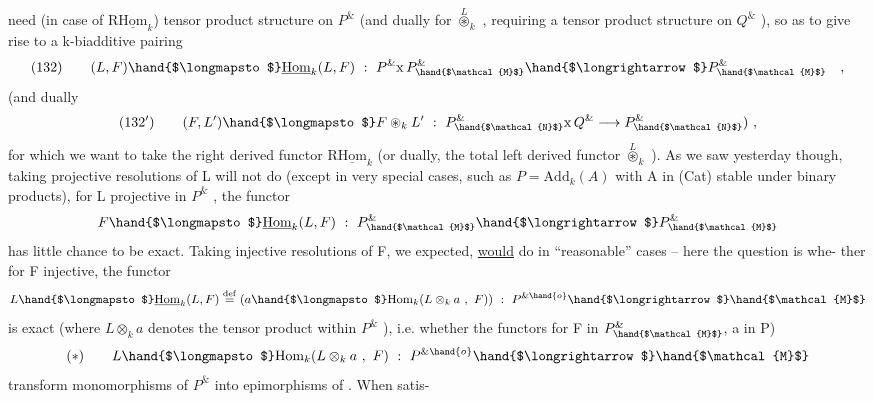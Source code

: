 
need (in case of R$\underline{\mathrm{Hom}}_k$)   tensor product structure on $P^{\&}$ (and dually
for $\overset{L}{\circledast}_k$ , requiring a tensor product structure on $Q^{\&}$ ), so as to give
rise to a  k-biadditive pairing
\[ (132) \qquad (L,F)\hand{$\longmapsto$}\underline{\mathrm{Hom}}_k(L,F) \ : \ P^{\&} \mathrm{x}\, P^{\&}_{\hand{$\mathcal{M}$}} \hand{$\longrightarrow$} P^{\&}_{\hand{$\mathcal{M}$}} \quad , \]
(and dually
\[ (132') \qquad (F,L')\hand{$\longmapsto$} F\circledast_k L' \ : \ P^{\&}_{\hand{$\mathcal{N}$}} \mathrm{x}\, Q^{\&} \longrightarrow P^{\&}_{\hand{$\mathcal{N}$}} ) \ , \]
for which we want to take the  right derived functor R$\underline{\mathrm{Hom}}_k$
(or dually, the total left derived functor $\overset{L}{\circledast}_k$ ). As we saw yesterday
though, taking projective resolutions of L will not do (except in very
special cases, such as $P = \mathrm{Add}_k(A)$ with A in (Cat) stable under
binary products),   for L projective in $P^{\&}$ , the functor
\[ F \hand{$\longmapsto$} \underline{\mathrm{Hom}}_k(L,F) \ : \ P^{\&}_{\hand{$\mathcal{M}$}} \hand{$\longrightarrow$} P^{\&}_{\hand{$\mathcal{M}$}} \]
has little chance to be exact. Taking injective resolutions of F\hand{\unsure{$_\bullet$}},  we
expected,  \uline{would} do in ``reasonable'' cases -- here the question is whe-%
ther for F injective, the functor
\[ L \hand{$\longmapsto$} \underline{\mathrm{Hom}}_k(L,F) \overset{\mathrm{def}}{=} (a \hand{$\longmapsto$} \mathrm{Hom}_k(L\otimes_k a \ , \ F)) \ : \ P^{\&\hand{o}} \hand{$\longrightarrow$} \hand{$\mathcal{M}$} \]
is exact (where $L\otimes_k a$ denotes the  tensor product within $P^{\&}$ ), i.e.
whether the functors \hand{(}for F in $P^{\&}_{\hand{$\mathcal{M}$}}$, a in P)
\[ (\ast) \qquad L \hand{$\longmapsto$} \mathrm{Hom}_k(L\otimes_k a \ , \ F) \ : \ P^{\&\hand{o}} \hand{$\longrightarrow$} \hand{$\mathcal{M}$} \]
transform monomorphisms of $P^{\&}$ into epimorphisms of . When  satis-%
